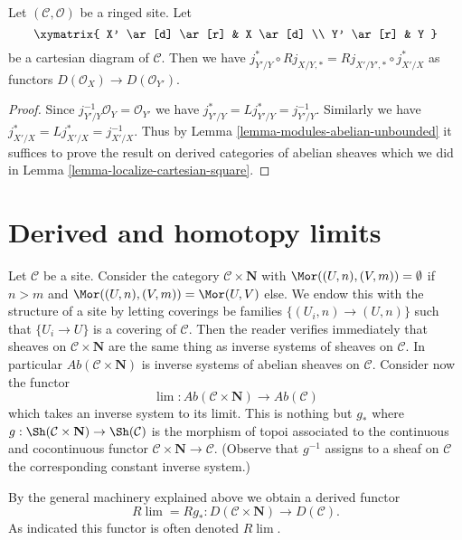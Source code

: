 \begin{lemma}
\label{lemma-localize-cartesian-square-modules}
Let $(\mathcal{C}, \mathcal{O})$ be a ringed site. Let
$$
\xymatrix{
X' \ar[d] \ar[r] & X \ar[d] \\
Y' \ar[r] & Y
}
$$
be a cartesian diagram of $\mathcal{C}$. Then we have
$j_{Y'/Y}^* \circ Rj_{X/Y, *} = Rj_{X'/Y', *} \circ j_{X'/X}^*$
as functors
$D(\mathcal{O}_X) \to D(\mathcal{O}_{Y'})$.
\end{lemma}

\begin{proof}
Since $j_{Y'/Y}^{-1}\mathcal{O}_Y = \mathcal{O}_{Y'}$ we have
$j_{Y'/Y}^* = Lj_{Y'/Y}^* = j_{Y'/Y}^{-1}$. Similarly we have
$j_{X'/X}^* = Lj_{X'/X}^* = j_{X'/X}^{-1}$. Thus by
Lemma \ref{lemma-modules-abelian-unbounded} it suffices
to prove the result on derived categories of abelian sheaves
which we did in
Lemma \ref{lemma-localize-cartesian-square}.
\end{proof}








\section{Derived and homotopy limits}
\label{section-derived-limits}

\noindent
Let $\mathcal{C}$ be a site. Consider the category
$\mathcal{C} \times \mathbf{N}$ with
$\Mor((U, n), (V, m)) = \emptyset$ if $n > m$ and
$\Mor((U, n), (V, m)) = \Mor(U, V)$ else. We endow this with the
structure of a site by letting coverings
be families $\{(U_i, n) \to (U, n)\}$ such that
$\{U_i \to U\}$ is a covering of $\mathcal{C}$.
Then the reader verifies immediately that
sheaves on $\mathcal{C} \times \mathbf{N}$ are the same thing
as inverse systems of sheaves on $\mathcal{C}$.
In particular $\textit{Ab}(\mathcal{C} \times \mathbf{N})$
is inverse systems of abelian sheaves on $\mathcal{C}$.
Consider now the functor
$$
\lim : \textit{Ab}(\mathcal{C} \times \mathbf{N}) \to \textit{Ab}(\mathcal{C})
$$
which takes an inverse system to its limit. This is nothing but
$g_*$ where $g : \Sh(\mathcal{C} \times \mathbf{N}) \to \Sh(\mathcal{C})$
is the morphism of topoi associated to the continuous and cocontinuous functor
$\mathcal{C} \times \mathbf{N} \to \mathcal{C}$. (Observe that
$g^{-1}$ assigns to a sheaf on $\mathcal{C}$ the corresponding
constant inverse system.)

\medskip\noindent
By the general machinery explained above we obtain a derived functor
$$
R\lim = Rg_* : D(\mathcal{C} \times \mathbf{N}) \to D(\mathcal{C}).
$$
As indicated this functor is often denoted $R\lim$.

